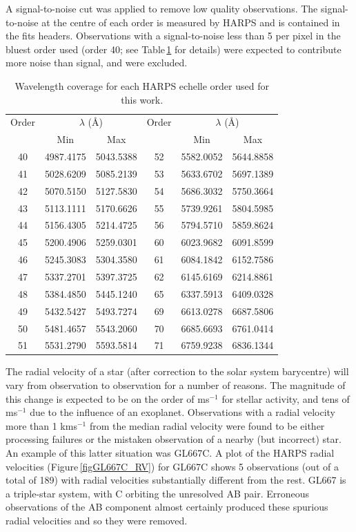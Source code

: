 A signal-to-noise cut was applied to remove low quality observations. The signal-to-noise at the centre of each order is measured by HARPS and is contained in the fits headers. Observations with a signal-to-noise less than 5 per pixel in the bluest order used (order 40; see Table\,\ref{tabHARPSwave} for details) were expected to contribute more noise than signal, and were excluded.\\   
\begin{table}
    \centering
    \begin{tabular}{|c|c|c||c|c|c|}
    \hline
    Order & \multicolumn{2}{c||}{$\lambda$ (\AA)} &  Order & \multicolumn{2}{c|}{$\lambda$ (\AA)}\\
    \cline{2-3}
    \cline{5-6}
     & Min & Max & & Min & Max\\
    \hline
40 & 4987.4175 & 5043.5388 & 52 & 5582.0052 & 5644.8858  \\
41 & 5028.6209 & 5085.2139 & 53 & 5633.6702 & 5697.1389  \\
42 & 5070.5150 & 5127.5830 & 54 & 5686.3032 & 5750.3664  \\
43 & 5113.1111 & 5170.6626 & 55 & 5739.9261 & 5804.5985  \\
44 & 5156.4305 & 5214.4725 & 56 & 5794.5710 & 5859.8624 \\
45 & 5200.4906 & 5259.0301 & 60 & 6023.9682 & 6091.8599  \\
46 & 5245.3083 & 5304.3580 & 61 & 6084.1842 & 6152.7586  \\
47 & 5337.2701 & 5397.3725 & 62 & 6145.6169 & 6214.8861  \\
48 & 5384.4850 & 5445.1240 & 65 & 6337.5913 & 6409.0328  \\
49 & 5432.5427 & 5493.7274 & 69 & 6613.0278 & 6687.5806  \\
50 & 5481.4657 & 5543.2060 & 70 & 6685.6693 & 6761.0414  \\
51 & 5531.2790 & 5593.5814 & 71 & 6759.9238 & 6836.1344  \\

\hline
    \end{tabular}
    \caption{Wavelength coverage for each HARPS echelle order used for this work.}
    \label{tabHARPSwave}
\end{table}

The radial velocity of a star (after correction to the solar system barycentre) will vary from observation to observation for a number of reasons. The magnitude of this change is expected to be on the order of ms$^{-1}$ for stellar activity, and tens of ms$^{-1}$ due to the influence of an exoplanet. Observations with a radial velocity more than 1 kms$^{-1}$ from the median radial velocity were found to be either processing failures or the mistaken observation of a nearby (but incorrect) star. An example of this latter situation was GL667C. A plot of the HARPS radial velocities (Figure\,\ref{figGL667C_RV}) for GL667C shows 5 observations (out of a total of 189) with radial velocities substantially different from the rest. GL667 is a triple-star system, with C orbiting the unresolved AB pair. Erroneous observations of the AB component almost certainly produced these spurious radial velocities and so they were removed.\\

